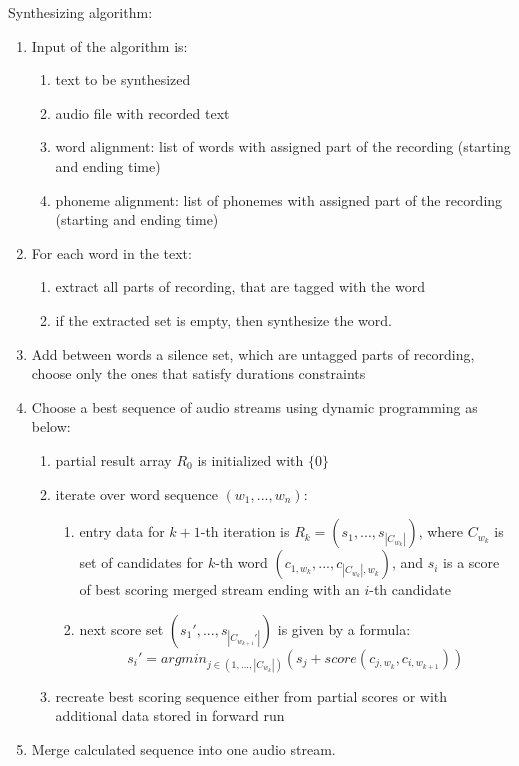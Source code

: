 \documentclass[12pt,a4paper,english]{article}
\begin{document}
Synthesizing algorithm:
\begin{enumerate}
    \item Input of the algorithm is:
        \begin{enumerate}
            \item text to be synthesized
            \item audio file with recorded text
            \item word alignment: list of words with assigned part of the recording (starting and ending time)
            \item phoneme alignment: list of phonemes with assigned part of the recording (starting and ending time)
        \end{enumerate}
    \item For each word in the text:
        \begin{enumerate}
            \item extract all parts of recording, that are tagged with the word
            \item if the extracted set is empty, then synthesize the word.
        \end{enumerate}
    \item Add between words a silence set, which are untagged parts of recording, \newline
          choose only the ones that satisfy durations constraints
    \item Choose a best sequence of audio streams using dynamic programming as below:
        \begin{enumerate}
            \item partial result array $R_0$ is initialized with $\{0\}$
            \item iterate over word sequence $(w_1, ..., w_n)$:
                \begin{enumerate}
                    \item entry data for $k+1$-th iteration is $R_k = (s_1, ..., s_{|C_{w_k}|})$,
                    where $C_{w_k}$ is set of candidates for $k$-th word $(c_{1, w_k}, ..., c_{|C_{w_k}|, w_k})$,
                    and $s_i$ is a score of best scoring merged stream ending with an $i$-th candidate
                    \item next score set $(s_1', ..., s_{|C_{w_{k+1}}'|})$ is given by a formula:
                    \begin{equation}
                        s_i' = argmin_{j \in (1,...,|C_{w_k}|)} (s_j + score(c_{j, w_k}, c_{i, w_{k+1}}))
                    \end{equation}
                \end{enumerate}
            \item recreate best scoring sequence either from partial scores or with additional data stored in forward run
        \end{enumerate}
    \item Merge calculated sequence into one audio stream.
\end{enumerate}
\end{document}
